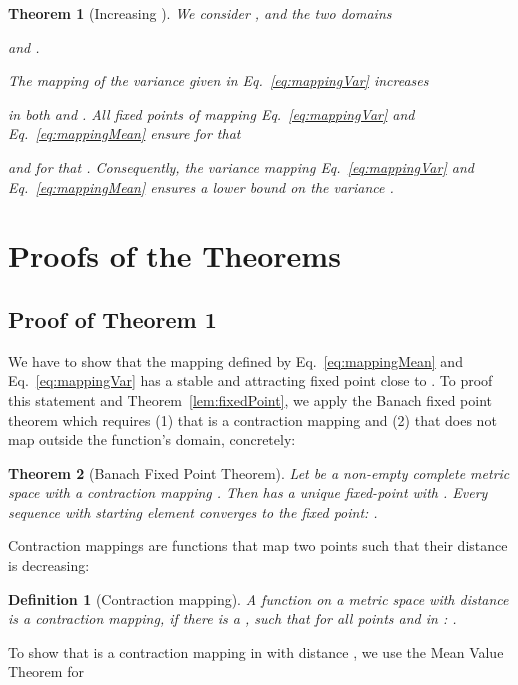 \documentclass{article}
\newtheorem{theorem}{Theorem}
\newtheorem{definition}{Definition}
\begin{document}
\begin{theorem}[Increasing ]
We consider , 
and the two domains 
 
 and
. 

The mapping of the variance
  given in Eq.~\eqref{eq:mappingVar} increases

in both  and .
All fixed
points  of mapping Eq.~\eqref{eq:mappingVar} and
Eq.~\eqref{eq:mappingMean} ensure for  that
 
and for  that .
Consequently, the variance mapping Eq.~\eqref{eq:mappingVar} and
Eq.~\eqref{eq:mappingMean} ensures a lower bound on the variance . 
\end{theorem}



\section{Proofs of the Theorems}
\label{sec:proofs}

\subsection{Proof of Theorem 1} 

We have to show that the mapping  defined by Eq.~\eqref{eq:mappingMean}
and Eq.~\eqref{eq:mappingVar} 
has a stable and attracting fixed point close to .
To proof this statement and Theorem~\ref{lem:fixedPoint}, 
we apply the Banach fixed point theorem which 
requires (1) that  is a contraction mapping and (2) 
that  does not map outside the function's 
domain, concretely: 

\begin{theorem}[Banach Fixed Point Theorem]
\label{lem:Banach} 
Let  be a non-empty complete metric space with a 
contraction mapping . Then  has 
a unique fixed-point  with . 
Every sequence 
with starting element  converges to the fixed point:
.
\end{theorem}

Contraction mappings are functions that map two points such that their distance is decreasing:
\begin{definition}[Contraction mapping]
 A function  on a metric space  with distance  is a contraction mapping, if there
 is a , such that for all points  and  in :
 .
\end{definition}


To show that  is a contraction mapping in  with distance , we use the Mean Value 
Theorem for 
\end{document}
